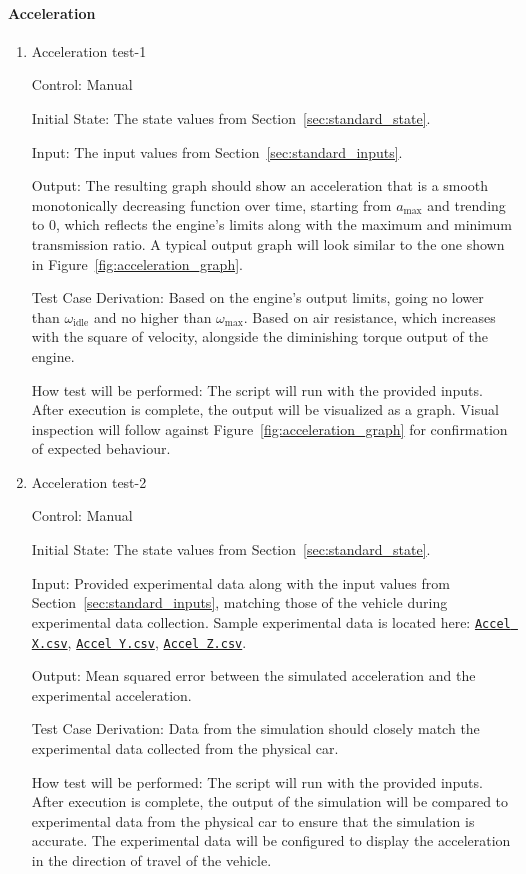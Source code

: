 \documentclass[12pt, titlepage]{article}
\newcommand{\refdata}[2]{
  \href{https://github.com/gr812b/CVT-Simulator/blob/main/experimental-data/#1
  }{\texttt{#2}}}
\begin{document}
\paragraph{Acceleration}

\begin{enumerate}

  \item{Acceleration test-1\\}
  
  Control: Manual
            
  Initial State: The state values from Section~\ref{sec:standard_state}.
  
  Input: The input values from Section~\ref{sec:standard_inputs}.
            
  Output: The resulting graph should show an acceleration that is a smooth monotonically decreasing function over time, starting from $a_\text{max}$ and trending to 0, which reflects the engine's limits along with the maximum and minimum transmission ratio. A typical output graph will look similar to the one shown in Figure~\ref{fig:acceleration_graph}.
  
  Test Case Derivation: Based on the engine's output limits, going no lower than $\omega_\text{idle}$ and no higher than $\omega_\text{max}$.
  Based on air resistance, which increases with the square of velocity, alongside the diminishing torque output of the engine.
  
  How test will be performed: The script will run with the provided inputs. After execution is complete, the output will be visualized as a graph. Visual inspection will follow against Figure~\ref{fig:acceleration_graph} for confirmation of expected behaviour.

  \item{Acceleration test-2\\}

  Control: Manual

  Initial State: The state values from Section~\ref{sec:standard_state}.

  Input: Provided experimental data along with the input values from Section~\ref{sec:standard_inputs}, matching those of the vehicle during experimental data collection. Sample experimental data is located here: \refdata{IMU\%20ACCEL\%20X.csv}{Accel X.csv}, \refdata{IMU\%20ACCEL\%20Y.csv}{Accel Y.csv}, \refdata{IMU\%20ACCEL\%20Z.csv}{Accel Z.csv}.

  Output: Mean squared error between the simulated acceleration and the experimental acceleration.

  Test Case Derivation: Data from the simulation should closely match the experimental data collected from the physical car.

  How test will be performed: The script will run with the provided inputs. After execution is complete, the output of the simulation will be compared to experimental data from the physical car to ensure that the simulation is accurate. The experimental data will be configured to display the acceleration in the direction of travel of the vehicle.

\end{enumerate}
\end{document}
